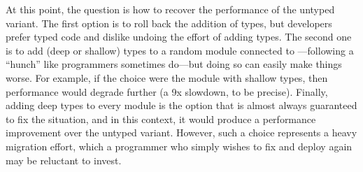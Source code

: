 
At this point, the question is how to recover the performance of the untyped
variant. The first option is to roll back the addition of types, but developers
prefer typed code and dislike undoing the effort of adding types. The second one
is to add (deep or shallow) types to a random module connected to ---following a
``hunch'' like programmers sometimes do---but doing so can easily make things
worse. For example, if the choice were the  module with shallow
types, then performance would degrade further (a 9x slowdown, to be
precise). Finally, adding deep types to every module is the option that is almost
always guaranteed to fix the situation, and in this context, it would produce a
performance improvement over the untyped variant.  However, such a choice
represents a heavy migration effort, which a programmer who simply
wishes to fix  and deploy again may be reluctant to invest.



